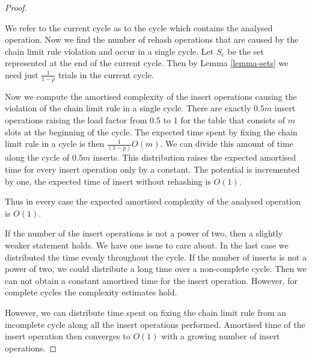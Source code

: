 \begin{proof}
\begin{itemize}
We refer to the current cycle as to the cycle which contains the analysed operation. Now we find the number of rehash operations that are caused by the chain limit rule violation and occur in a single cycle. Let $S_e$ be the set represented at the end of the current cycle. Then by Lemma \ref{lemma-sets} we need just $\frac{1}{1 - p}$ trials in the current cycle.

Now we compute the amortised complexity of the insert operations causing the violation of the chain limit rule in a single cycle. There are exactly $0.5 m$ insert operations raising the load factor from $0.5$ to $1$ for the table that consists of $m$ slots at the beginning of the cycle. The expected time spent by fixing the chain limit rule in a cycle is then $\frac{1}{(1 - p)}O(m)$. We can divide this amount of time along the cycle of $0.5 m$ inserts. This distribution raises the expected amortised time for every insert operation only by a constant. The potential is incremented by one, the expected time of insert without rehashing is $O(1)$.
\end{itemize}

Thus in every case the expected amortised complexity of the analysed operation is $O(1)$.

If the number of the insert operations is not a power of two, then a slightly weaker statement holds. We have one issue to care about. In the last case we distributed the time evenly throughout the cycle. If the number of inserts is not a power of two, we could distribute a long time over a non-complete cycle. Then we can not obtain a constant amortised time for the insert operation. However, for complete cycles the complexity estimates hold.

However, we can distribute time spent on fixing the chain limit rule from an incomplete cycle along all the insert operations performed. Amortised time of the insert operation then converges to $O(1)$ with a growing number of insert operations.
\end{proof}

